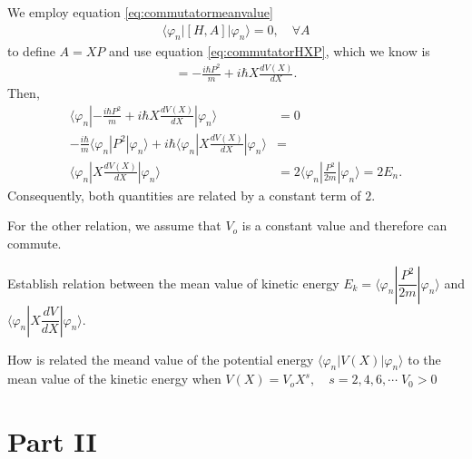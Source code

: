 \documentclass[letterpaper,11pt,twoside]{article}
\newcommand{\braket}[1]{\langle#1\rangle}
\begin{document}
\begin{enumerate}[itemsep=0pt,topsep=0pt,label=\alph*.]
\begin{enumerate}[itemsep=0pt,topsep=0pt]
    We employ equation \eqref{eq:commutatormeanvalue}
    \begin{align*}
      \braket{\varphi_n|[H,A]|\varphi_n}=0,\quad\forall A
    \end{align*}
    to define $A=XP$ and use equation \eqref{eq:commutatorHXP}, which we know is
    \begin{align*}
      [H,XP]=-\frac{i\hbar P^2}{m}+i\hbar X\frac{dV(X)}{dX}.
    \end{align*}
    Then, 
    \begin{align*}
      \braket{\varphi_n|-\frac{i\hbar P^2}{m}+i\hbar X\frac{dV(X)}{dX}|\varphi_n}&=0\\
      -\frac{i\hbar}{m}\braket{\varphi_n|P^2|\varphi_n}+i\hbar\braket{\varphi_n|X\frac{dV(X)}{dX}|\varphi_n}&=\\
      \braket{\varphi_n|X\frac{dV(X)}{dX}|\varphi_n}&=2\braket{\varphi_n|\frac{P^2}{2m}|\varphi_n}=2E_n.
    \end{align*}
    Consequently, both quantities are related by a constant term of $2$.

    For the other relation, we assume that $V_o$ is a constant value and therefore can commute.
    
    


    Establish relation between the mean value of kinetic energy $E_k=\braket{\varphi_n|\dfrac{P^2}{2m}|\varphi_n}$ and $\braket{\varphi_n|X\dfrac{dV}{dX}|\varphi_n}$.
    
    How is related the meand value of the potential energy $\braket{\varphi_n|V(X)|\varphi_n}$ to the mean value of the kinetic energy when $V(X)=V_oX^s,\quad s=2,4,6,\cdots\;V_0>0$ 



  \end{enumerate}
\end{enumerate}

\section*{Part II}
%
\end{document}

